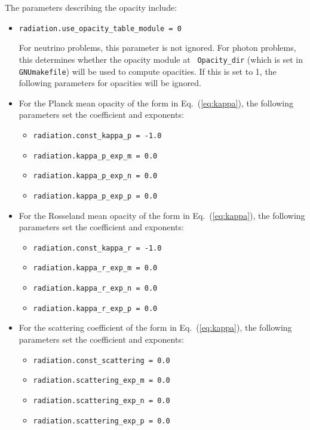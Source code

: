 The parameters describing the opacity include:
\begin{itemize}

\item {\tt radiation.use\_opacity\_table\_module = 0}
  
  For neutrino problems, this parameter is not ignored.  For photon
  problems, this determines whether the opacity module at {\tt
    Opacity\_dir} (which is set in {\tt GNUmakefile}) will be used to
  compute opacities.  If this is set to 1, the following parameters
  for opacities will be ignored.

\item For the Planck mean opacity of the form in Eq.~(\ref{eq:kappa}),
  the following parameters set the coefficient and exponents:
  \begin{itemize}
  \item {\tt radiation.const\_kappa\_p = -1.0}
  \item {\tt radiation.kappa\_p\_exp\_m = 0.0}
  \item {\tt radiation.kappa\_p\_exp\_n = 0.0}
  \item {\tt radiation.kappa\_p\_exp\_p = 0.0}
  \end{itemize}

\item For the Rosseland mean opacity of the form in Eq.~(\ref{eq:kappa}),
  the following parameters set the coefficient and exponents:
  \begin{itemize}
  \item {\tt radiation.const\_kappa\_r = -1.0}
  \item {\tt radiation.kappa\_r\_exp\_m = 0.0}
  \item {\tt radiation.kappa\_r\_exp\_n = 0.0}
  \item {\tt radiation.kappa\_r\_exp\_p = 0.0}
  \end{itemize}
  
\item For the scattering coefficient of the form in Eq.~(\ref{eq:kappa}),
  the following parameters set the coefficient and exponents:
  \begin{itemize}
  \item {\tt radiation.const\_scattering = 0.0}
  \item {\tt radiation.scattering\_exp\_m = 0.0}
  \item {\tt radiation.scattering\_exp\_n = 0.0}
  \item {\tt radiation.scattering\_exp\_p = 0.0}
  \end{itemize}


\end{itemize}
